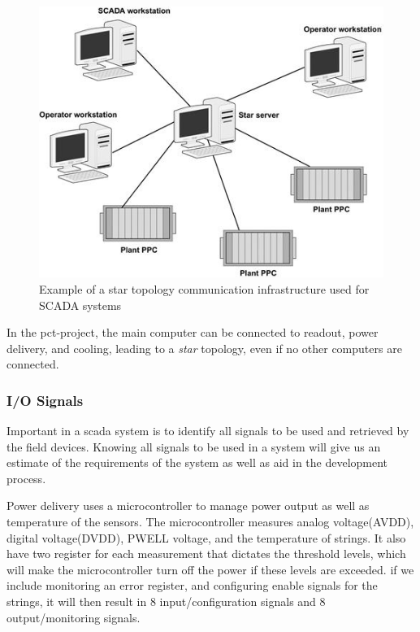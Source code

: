 \documentclass[main.tex]{subfiles}
\begin{document}
\begin{figure}[!ht]
    \centering
    \includegraphics[scale=0.6]{images/scada_topology.png}
    \caption{Example of a star topology communication infrastructure used for SCADA systems\cite{scada_design}}
    \label{fig: scada_star}
\end{figure}
\FloatBarrier

In the \gls{pct}-project, the main computer can be connected to readout, power delivery, and cooling, leading to a \textit{star} topology, even if no other computers are connected.

\subsubsection{I/O Signals}

Important in a \gls{scada} system is to identify all signals to be used and retrieved by the field devices. Knowing all signals to be used in a system will give us an estimate of the requirements of the system as well as aid in the development process.

Power delivery uses a microcontroller to manage power output as well as temperature of the sensors. The microcontroller measures analog voltage(AVDD), digital voltage(DVDD), PWELL voltage, and the temperature of strings. It also have two register for each measurement that dictates the threshold levels, which will make the microcontroller turn off the power if these levels are exceeded. if we include monitoring an error register, and configuring enable signals for the strings, it will then result in 8 input/configuration signals and 8 output/monitoring signals.
\end{document}
